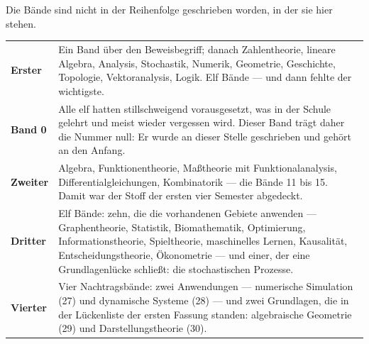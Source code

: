 \begin{merksatz}
Die Bände sind nicht in der Reihenfolge geschrieben worden, in der sie hier stehen.

\begin{center}
{\small
\renewcommand{\arraystretch}{1.55}
\begin{tabular}{@{}P{2.4cm}P{6.2cm}@{}}
\toprule
\textbf{Erster} & Ein Band über den Beweisbegriff; danach Zahlentheorie, lineare Algebra, Analysis, Stochastik, Numerik, Geometrie, Geschichte, Topologie, Vektoranalysis, Logik. Elf Bände --- und dann fehlte der wichtigste.\\
\textbf{Band 0} & Alle elf hatten stillschweigend vorausgesetzt, was in der Schule gelehrt und meist wieder vergessen wird. Dieser Band trägt daher die Nummer null: Er wurde an dieser Stelle geschrieben und gehört an den Anfang.\\
\textbf{Zweiter} & Algebra, Funktionentheorie, Maßtheorie mit Funktionalanalysis, Differentialgleichungen, Kombinatorik --- die Bände 11 bis 15. Damit war der Stoff der ersten vier Semester abgedeckt.\\
\textbf{Dritter} & Elf Bände: zehn, die die vorhandenen Gebiete anwenden --- Graphentheorie, Statistik, Biomathematik, Optimierung, Informationstheorie, Spieltheorie, maschinelles Lernen, Kausalität, Entscheidungstheorie, Ökonometrie --- und einer, der eine Grundlagenlücke schließt: die stochastischen Prozesse.\\
\textbf{Vierter} & Vier Nachtragsbände: zwei Anwendungen --- numerische Simulation (27) und dynamische Systeme (28) --- und zwei Grundlagen, die in der Lückenliste der ersten Fassung standen: algebraische Geometrie (29) und Darstellungstheorie (30).\\
\bottomrule
\end{tabular}}
\end{center}

\begin{center}
\begin{minipage}{0.88\textwidth}
\end{minipage}
\end{center}
\end{merksatz}

